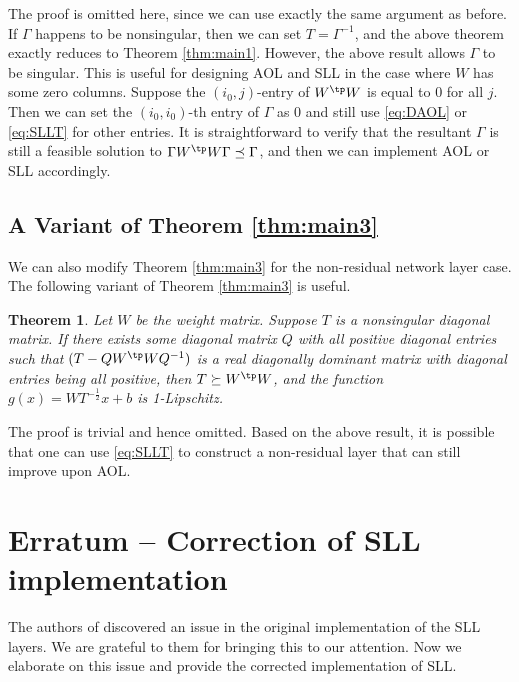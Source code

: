 \documentclass{article} \usepackage{iclr2023_conference,times}
\newtheorem{theorem}{Theorem}
\newcommand{\0}{\mathbf{0} }
\begin{document}
The proof is omitted here, since we can use exactly the same argument as before. If $\Gamma$ happens to be nonsingular, then we can set $T=\Gamma^{-1}$, and the above theorem exactly reduces to Theorem \ref{thm:main1}. However, the above result allows $\Gamma$ to be singular. This is useful for designing AOL and SLL in the case where $W$ has some zero columns. Suppose the $(i_0,j)$-entry of $W^\tp W$ is equal to $0$ for all $j$. Then we can set the $(i_0,i_0)$-th entry of $\Gamma$ as $0$ and still use \eqref{eq:DAOL} or \eqref{eq:SLLT} for other entries. It is straightforward to verify that the resultant $\Gamma$ is still a feasible solution to $\Gamma W^\tp W \Gamma\preceq \Gamma$, and then we can implement AOL or SLL accordingly. 


\subsection{A Variant of Theorem \ref{thm:main3}}

We can also modify Theorem \ref{thm:main3} for the non-residual network layer case. The following variant of Theorem \ref{thm:main3} is useful.


\begin{theorem}\label{thm:main7}
Let $W$ be the weight matrix. 
Suppose $T$ is a nonsingular diagonal matrix. 
If there exists some  diagonal matrix $Q$ with all positive diagonal entries such that $(T-QW^\tp W Q^{-1})$ is a real diagonally dominant matrix with diagonal entries being all positive, then $T\succeq W^\tp W$, and the function $g(x)=W T^{-\frac{1}{2}} x+b$ is 1-Lipschitz. 
\end{theorem}
The proof is trivial and hence omitted. Based on the above result, it is possible that one can use \eqref{eq:SLLT} to construct a non-residual layer that can still improve upon AOL.

\newpage

\section{Erratum -- Correction of SLL implementation}

The authors of \cite{hu2023recipe} discovered an issue in the original implementation of the SLL layers. We are grateful to them for bringing this to our attention. Now we elaborate on this issue and provide the corrected implementation of SLL.  
\end{document}
